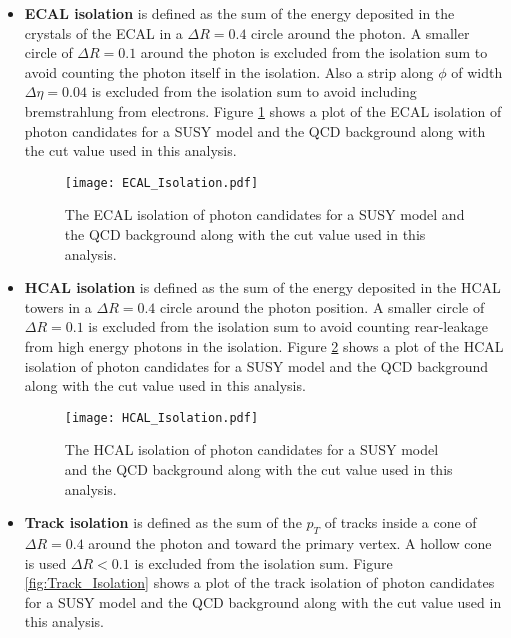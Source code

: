 \begin{itemize}
\item {\bf ECAL isolation} is defined as the sum of the energy deposited in the
crystals of the ECAL in a $\Delta R = 0.4$ circle around the photon. A smaller 
circle of $\Delta R = 0.1$ around the photon is excluded from the isolation sum 
to avoid counting the photon itself in the isolation. Also a strip along $\phi$ 
of width $\Delta \eta = 0.04$ is excluded from the isolation sum to avoid 
including bremstrahlung from electrons. Figure \ref{fig:ECAL_Isolation} shows a
plot of the ECAL isolation of photon candidates for a SUSY model and the QCD 
background along with the cut value used in this analysis.

\begin{figure}
\begin{center}
\texttt{[image: ECAL\_Isolation.pdf]}
\end{center}
\caption{The ECAL isolation of photon candidates for a SUSY model and the QCD 
background along with the cut value used in this analysis.}
\label{fig:ECAL_Isolation}
\end{figure}

\item {\bf HCAL isolation} is defined as the sum of the energy deposited in the 
HCAL towers in a $\Delta R = 0.4$ circle around the photon position. A smaller 
circle of $\Delta R = 0.1$ is excluded from the isolation sum to avoid counting 
rear-leakage from high energy photons in the isolation. Figure 
\ref{fig:HCAL_Isolation} shows a plot of the HCAL isolation of photon candidates 
for a SUSY model and the QCD background along with the cut value used in this 
analysis.


\begin{figure}
\begin{center}
\texttt{[image: HCAL\_Isolation.pdf]}
\end{center}
\caption{The HCAL isolation of photon candidates for a SUSY model and the QCD 
background along with the cut value used in this analysis.}
\label{fig:HCAL_Isolation}
\end{figure}

\item {\bf Track isolation} is defined as the sum of the $p_{T}$ of tracks 
inside a cone of $\Delta R = 0.4$ around the photon and toward the primary 
vertex. A hollow cone is used $\Delta R < 0.1$ is excluded from the isolation 
sum. Figure \ref{fig:Track_Isolation} shows a plot of the track isolation of
photon candidates for a SUSY model and the QCD background along with the cut 
value used in this analysis.



\end{itemize}
